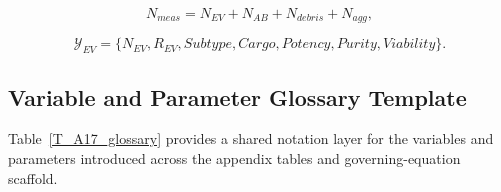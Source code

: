 \documentclass[Afour,sagev,times]{sagej}
\begin{document}
\begin{equation}
N_{meas}=N_{EV}+N_{AB}+N_{debris}+N_{agg},
\end{equation}

\begin{equation}
\mathcal{Y}_{EV}=\{N_{EV},R_{EV},Subtype,Cargo,Potency,Purity,Viability\}.
\end{equation}

\subsection*{Variable and Parameter Glossary Template}

Table~\ref{T_A17_glossary} provides a shared notation layer for the variables and parameters introduced across the appendix tables and governing-equation scaffold.
\end{document}
